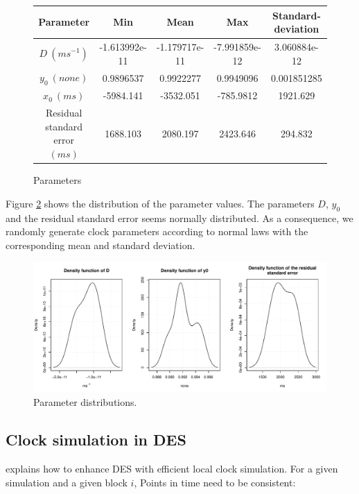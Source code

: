 \documentclass[11pt]{article}
\begin{document}
\begin{figure}[h!]
\scriptsize
\begin{center}
\begin{tabular}{|c|c|c|c|c|} 
\hline
Parameter & Min & Mean & Max & Standard-deviation \\
\hline
$D\ (ms^{-1})$ & -1.613992e-11 & -1.179717e-11 & -7.991859e-12 & 3.060884e-12 \\
\hline
$y_0\ (none)$ & 0.9896537 & 0.9922277 & 0.9949096 & 0.001851285\\
\hline
$x_0\ (ms)$ & -5984.141 & -3532.051 & -785.9812 & 1921.629\\
\hline
Residual standard error $(ms)$ & 1688.103 &  2080.197  & 2423.646 & 294.832\\
\hline
\end{tabular}
\end{center}
\label{fig:parameter-values}
\caption{Parameters}
\end{figure}

Figure \ref{fig:parameter-distribution} shows the distribution of the parameter values. The parameters $D$, $y_0$ and the residual standard error seems normally distributed. As a consequence, we randomly generate clock parameters according to normal laws with the corresponding mean and standard deviation.

\begin{figure}[h!]
\centering
\includegraphics[width=\textwidth]{pictures/parameters.pdf}
\caption{Parameter distributions.}
\label{fig:parameter-distribution}
\end{figure}

\newpage

\subsection{Clock simulation in DES}

\cite{ring2010clock} explains how to enhance DES with efficient local clock simulation. For a given simulation and a given block $i$, Points in time need to be consistent:
\end{document}
